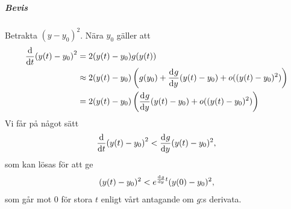\subparagraph{Bevis}
Betrakta $(y - y_{0})^{2}$. Nära $y_{0}$ gäller att
\begin{align*}
	\dv{t}(y(t) - y_{0})^{2} &= 2(y(t) - y_{0})g(y(t)) \\
	                         &\approx 2(y(t) - y_{0})\left(g(y_{0}) + \dv[]{g}{y} (y_{0})(y(t) - y_{0}) + o((y(t) - y_{0})^{2})\right) \\
	                         &= 2(y(t) - y_{0})\left(\dv[]{g}{y} (y_{0})(y(t) - y_{0}) + o((y(t) - y_{0})^{2})\right)
\end{align*}
Vi får på något sätt
\begin{align*}
	\dv{t}(y(t) - y_{0})^{2} < \dv[]{g}{y} (y_{0})(y(t) - y_{0})^{2},
\end{align*}
som kan lösas för att ge
\begin{align*}
	(y(t) - y_{0})^{2} < e^{\dv[]{g}{y} (y_{0})t}(y(0) - y_{0})^{2},
\end{align*}
som går mot $0$ för stora $t$ enligt vårt antagande om $g$:s derivata.

